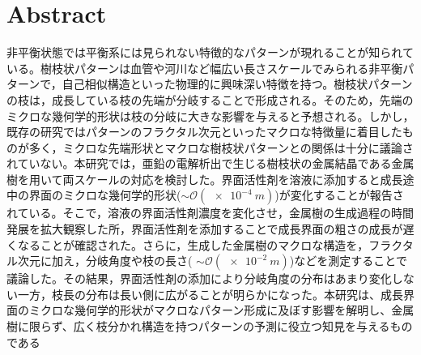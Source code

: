 \documentclass[autodetect-engine,dvi=dvipdfmx,a4paper,ja=standard,oneside,openany,11pt,draft]{bxjsarticle}
\begin{document}
\section{Abstract}
非平衡状態では平衡系には見られない特徴的なパターンが現れることが知られている。樹枝状パターンは血管や河川など幅広い長さスケールでみられる非平衡パターンで，自己相似構造といった物理的に興味深い特徴を持つ。樹枝状パターンの枝は，成長している枝の先端が分岐することで形成される。そのため，先端のミクロな幾何学的形状は枝の分岐に大きな影響を与えると予想される。しかし，既存の研究ではパターンのフラクタル次元といったマクロな特徴量に着目したものが多く，ミクロな先端形状とマクロな樹枝状パターンとの関係は十分に議論されていない。本研究では，亜鉛の電解析出で生じる樹枝状の金属結晶である金属樹を用いて両スケールの対応を検討した。界面活性剤を溶液に添加すると成長途中の界面のミクロな幾何学的形状($\sim\mathcal{O}(\SI{e-4}{m})$)が変化することが報告されている。そこで，溶液の界面活性剤濃度を変化させ，金属樹の生成過程の時間発展を拡大観察した所，界面活性剤を添加することで成長界面の粗さの成長が遅くなることが確認された。さらに，生成した金属樹のマクロな構造を，フラクタル次元に加え，分岐角度や枝の長さ( $\sim\mathcal{O}(\SI{e-2}{m})$)などを測定することで議論した。その結果，界面活性剤の添加により分岐角度の分布はあまり変化しない一方，枝長の分布は長い側に広がることが明らかになった。本研究は、成長界面のミクロな幾何学的形状がマクロなパターン形成に及ぼす影響を解明し、金属樹に限らず、広く枝分かれ構造を持つパターンの予測に役立つ知見を与えるものである

\ifdraft{
  
  
}{}
\end{document}

